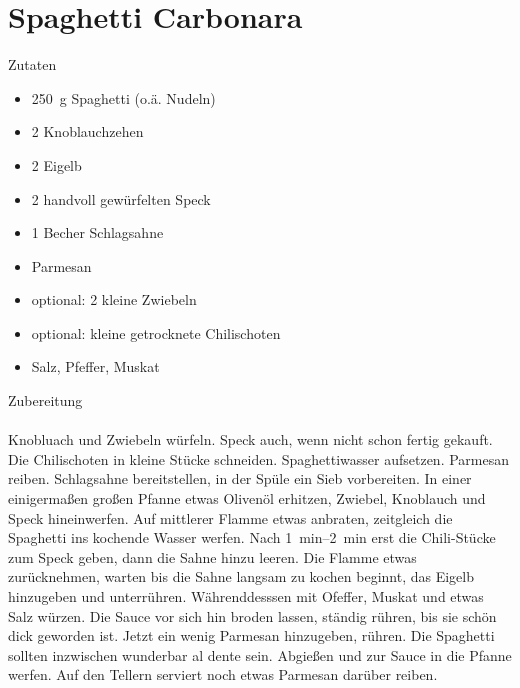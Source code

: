 \section*{Spaghetti Carbonara}
\ihead{}\ohead{}
\cfoot{}
{\Large Zutaten}
\begin{multicols}{2}
\begin{itemize}
    \item \SI{250}{g} Spaghetti (o.ä. Nudeln)
    \item \num{2} Knoblauchzehen
    \item \num{2} Eigelb
    \item \num{2} handvoll gewürfelten Speck
    \item \num{1} Becher Schlagsahne
    \item Parmesan
    \item optional: \num{2} kleine Zwiebeln
    \item optional: kleine getrocknete Chilischoten
    \item Salz, Pfeffer, Muskat
\end{itemize}
\end{multicols}
\noindent
{\Large Zubereitung}\\
\\
Knobluach und Zwiebeln würfeln.
Speck auch, wenn nicht schon fertig gekauft.
Die Chilischoten in kleine Stücke schneiden.
Spaghettiwasser aufsetzen.
Parmesan reiben.
Schlagsahne bereitstellen, in der Spüle ein Sieb vorbereiten.
In einer einigermaßen großen Pfanne etwas Olivenöl erhitzen, Zwiebel, Knoblauch und Speck hineinwerfen.
Auf mittlerer Flamme etwas anbraten, zeitgleich die Spaghetti ins kochende Wasser werfen.
Nach \SIrange{1}{2}{min} erst die Chili-Stücke zum Speck geben, dann die Sahne hinzu leeren.
Die Flamme etwas zurücknehmen, warten bis die Sahne langsam zu kochen beginnt, das Eigelb hinzugeben und unterrühren.
Währenddesssen mit Ofeffer, Muskat und etwas Salz würzen.
Die Sauce vor sich hin broden lassen, ständig rühren, bis sie schön dick geworden ist.
Jetzt ein wenig Parmesan hinzugeben, rühren.
Die Spaghetti sollten inzwischen wunderbar al dente sein.
Abgießen und zur Sauce in die Pfanne werfen.
Auf den Tellern serviert noch etwas Parmesan darüber reiben.